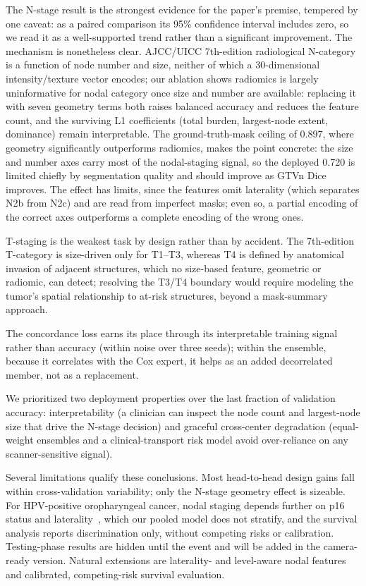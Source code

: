 \documentclass[runningheads]{llncs}
\begin{document}
The N-stage result is the strongest evidence for the paper's premise, tempered by one caveat: as a paired comparison its 95\% confidence interval includes zero, so we read it as a well-supported trend rather than a significant improvement. The mechanism is nonetheless clear. AJCC/UICC 7th-edition radiological N-category is a function of node number and size, neither of which a 30-dimensional intensity/texture vector encodes; our ablation shows radiomics is largely uninformative for nodal category once size and number are available: replacing it with seven geometry terms both raises balanced accuracy and reduces the feature count, and the surviving L1 coefficients (total burden, largest-node extent, dominance) remain interpretable. The ground-truth-mask ceiling of 0.897, where geometry significantly outperforms radiomics, makes the point concrete: the size and number axes carry most of the nodal-staging signal, so the deployed 0.720 is limited chiefly by segmentation quality and should improve as GTVn Dice improves. The effect has limits, since the features omit laterality (which separates N2b from N2c) and are read from imperfect masks; even so, a partial encoding of the correct axes outperforms a complete encoding of the wrong ones.

T-staging is the weakest task by design rather than by accident. The 7th-edition T-category is size-driven only for T1--T3, whereas T4 is defined by anatomical invasion of adjacent structures, which no size-based feature, geometric or radiomic, can detect; resolving the T3/T4 boundary would require modeling the tumor's spatial relationship to at-risk structures, beyond a mask-summary approach.

The concordance loss earns its place through its interpretable training signal rather than accuracy (within noise over three seeds); within the ensemble, because it correlates with the Cox expert, it helps as an added decorrelated member, not as a replacement.

We prioritized two deployment properties over the last fraction of validation accuracy: interpretability (a clinician can inspect the node count and largest-node size that drive the N-stage decision) and graceful cross-center degradation (equal-weight ensembles and a clinical-transport risk model avoid over-reliance on any scanner-sensitive signal).

Several limitations qualify these conclusions. Most head-to-head design gains fall within cross-validation variability; only the N-stage geometry effect is sizeable. For HPV-positive oropharyngeal cancer, nodal staging depends further on p16 status and laterality~\cite{ref22}, which our pooled model does not stratify, and the survival analysis reports discrimination only, without competing risks or calibration. Testing-phase results are hidden until the event and will be added in the camera-ready version. Natural extensions are laterality- and level-aware nodal features and calibrated, competing-risk survival evaluation.
\end{document}
